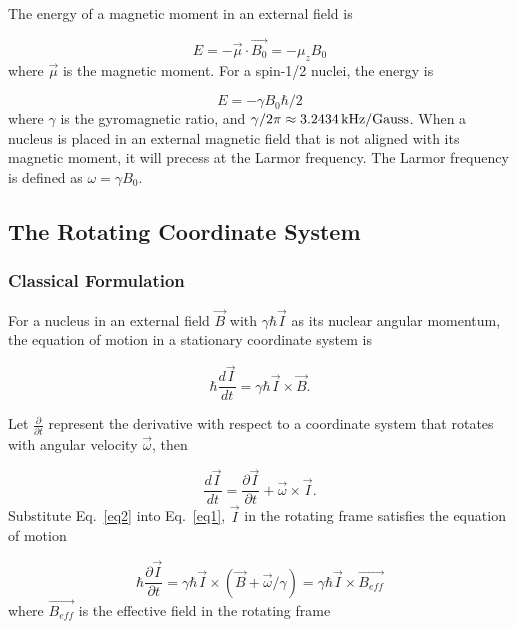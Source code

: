 The energy of a magnetic moment in an external field is

\begin{equation}
E = -\vec{\mu}\cdot \vec{B_{0}} = -\mu_{z}B_{0}
\end{equation}
where $\vec{\mu}$ is the magnetic moment. For a spin-1/2 nuclei, the energy is

\begin{equation}
E = -\gamma B_{0}\hbar/2
\end{equation}
where $\gamma$ is the gyromagnetic ratio, and $\gamma /2\pi \approx 3.2434\,{\rm kHz/Gauss}$. When a nucleus is placed in an external magnetic field that is not aligned with its magnetic moment, it will precess at the Larmor frequency. The Larmor frequency is defined as $\omega=\gamma B_{0}$.

\subsection{The Rotating Coordinate System}

\subsubsection{Classical Formulation}

For a nucleus in an external field $\vec{B}$ with $\gamma \hbar \vec{I}$ as its nuclear angular momentum, the equation of motion in a stationary coordinate system is \cite{RevModPhys.26.167}

\begin{equation}\label{eq1}
\hbar \frac{d\vec{I}}{dt}=\gamma \hbar \vec{I} \times \vec{B}.
\end{equation}

Let $\frac{\partial}{\partial t}$ represent the derivative with respect to a coordinate system that rotates with angular velocity $\vec{\omega}$, then

\begin{equation}\label{eq2}
\frac{d\vec{I}}{dt}=\frac{\partial \vec{I}}{\partial t}+\vec{\omega} \times \vec{I}.
\end{equation}
Substitute Eq.~\ref{eq2} into Eq.~\ref{eq1}, $\vec{I}$ in the rotating frame satisfies the equation of motion 

\begin{equation}
\hbar \frac{\partial \vec{I}}{\partial t}=\gamma \hbar \vec{I} \times (\vec{B} + \vec{\omega}/\gamma)=\gamma \hbar \vec{I} \times \vec{B_{eff}}
\end{equation}
where $\vec{B_{eff}}$ is the effective field in the rotating frame

